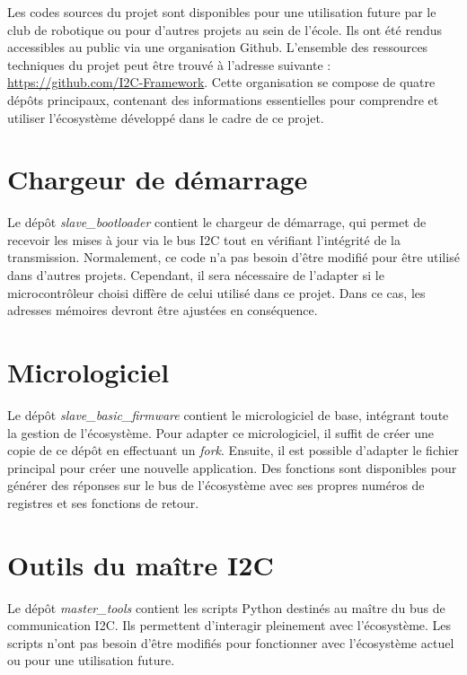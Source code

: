 Les codes sources du projet sont disponibles pour une utilisation future par le club de robotique ou pour d'autres projets au sein de l'école.
Ils ont été rendus accessibles au public via une organisation Github.
L'ensemble des ressources techniques du projet peut être trouvé à l'adresse suivante : \url{https://github.com/I2C-Framework}.
Cette organisation se compose de quatre dépôts principaux, contenant des informations essentielles pour comprendre et utiliser l'écosystème développé dans le cadre de ce projet.

\section{Chargeur de démarrage}

Le dépôt \textit{slave\_bootloader} contient le chargeur de démarrage, qui permet de recevoir les mises à jour via le bus I2C tout en vérifiant l'intégrité de la transmission.
Normalement, ce code n'a pas besoin d'être modifié pour être utilisé dans d'autres projets.
Cependant, il sera nécessaire de l'adapter si le microcontrôleur choisi diffère de celui utilisé dans ce projet.
Dans ce cas, les adresses mémoires devront être ajustées en conséquence.

\section{Micrologiciel}

Le dépôt \textit{slave\_basic\_firmware} contient le micrologiciel de base, intégrant toute la gestion de l'écosystème.
Pour adapter ce micrologiciel, il suffit de créer une copie de ce dépôt en effectuant un \textit{fork}.
Ensuite, il est possible d'adapter le fichier principal pour créer une nouvelle application.
Des fonctions sont disponibles pour générer des réponses sur le bus de l'écosystème avec ses propres numéros de registres et ses fonctions de retour.

\section{Outils du maître I2C}

Le dépôt \textit{master\_tools} contient les scripts Python destinés au maître du bus de communication I2C.
Ils permettent d'interagir pleinement avec l'écosystème.
Les scripts n'ont pas besoin d'être modifiés pour fonctionner avec l'écosystème actuel ou pour une utilisation future.